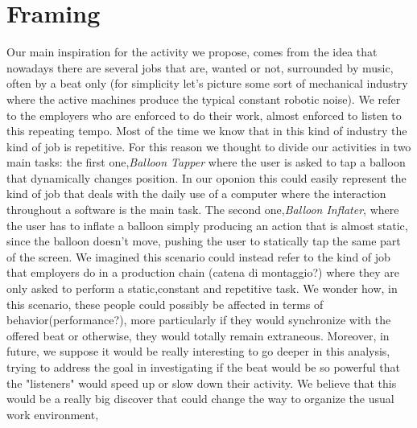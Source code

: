 
\section*{Framing}

Our main inspiration for the activity we propose, comes from the idea that nowadays there are several jobs that are, wanted or not, surrounded by music, often by a beat only (for simplicity let's picture some sort of mechanical industry where the active machines produce the typical constant robotic noise). We refer to the employers who are enforced to do their work, almost enforced to listen to this repeating tempo. Most of the time we know that in this kind of industry the kind of job is repetitive. For this reason we thought to divide our activities in two main tasks: the first one,\textit{Balloon Tapper} where the user is asked to tap a balloon that dynamically changes position. In our oponion this could easily represent the kind of job that deals with the daily use of a computer where the interaction throughout a software is the main task. The second one,\textit{Balloon Inflater}, where the user has to inflate a balloon simply producing an action that is almost static, since the balloon doesn't move, pushing the user to statically tap the same part of the screen. We imagined this scenario could instead refer to the kind of job that employers do in a production chain (catena di montaggio?) where they are only asked to perform a static,constant and repetitive task. 
We wonder how, in this scenario, these people could possibly be affected in terms of behavior(performance?), more particularly if they would synchronize with the offered beat or otherwise, they would totally remain extraneous.
Moreover, in future, we suppose it would be really interesting to go deeper in this analysis, trying to address the goal in investigating if the beat would be so powerful that the "listeners" would speed up or slow down their activity. We believe that this would be a really big discover that could change the way to organize the usual work environment,


